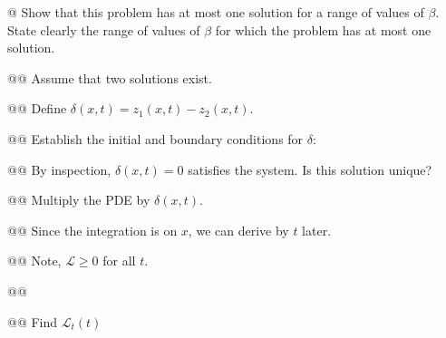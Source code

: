 \documentclass[10pt]{article}
\begin{document}
\begin{easylist}[enumerate]
    @ Show that this problem has at most one solution for a range of values of $\beta$. State clearly the range of
    values of $\beta$ for which the problem has at most one solution.

    @@ Assume that two solutions exist.

    @@ Define $\delta(x, t) = z_1(x, t) - z_2(x, t)$.

    @@ Establish the initial and boundary conditions for $\delta$:


    @@ By inspection, $\delta(x, t) = 0$ satisfies the system. Is this solution unique?

    @@ Multiply the PDE by $\delta(x, t)$.


    @@ Since the integration is on $x$, we can derive by $t$ later.


    @@ Note, $\mathcal{L} \ge 0$ for all $t$.

    @@


    @@ Find $\mathcal{L}_t(t)$



\end{easylist}
\end{document}
